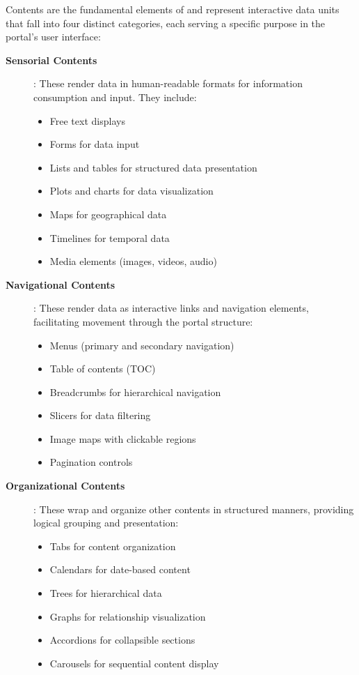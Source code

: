 Contents are the fundamental elements of \wbdl{} and represent interactive data units that fall into four distinct categories, each serving a specific purpose in the portal's user interface:

\begin{description}
\item[\textbf{Sensorial Contents}]: These render data in human-readable formats for information consumption and input. They include:
\begin{itemize}
\item Free text displays
\item Forms for data input
\item Lists and tables for structured data presentation
\item Plots and charts for data visualization
\item Maps for geographical data
\item Timelines for temporal data
\item Media elements (images, videos, audio)
\end{itemize}

\item[\textbf{Navigational Contents}]: These render data as interactive links and navigation elements, facilitating movement through the portal structure:
\begin{itemize}
\item Menus (primary and secondary navigation)
\item Table of contents (TOC)
\item Breadcrumbs for hierarchical navigation
\item Slicers for data filtering
\item Image maps with clickable regions
\item Pagination controls
\end{itemize}

\item[\textbf{Organizational Contents}]: These wrap and organize other contents in structured manners, providing logical grouping and presentation:
\begin{itemize}
\item Tabs for content organization
\item Calendars for date-based content
\item Trees for hierarchical data
\item Graphs for relationship visualization
\item Accordions for collapsible sections
\item Carousels for sequential content display
\end{itemize}


\end{description}
